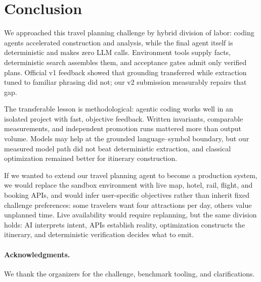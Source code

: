 \documentclass{article}
\begin{document}
\section{Conclusion}
\label{sec:conclusion}

We approached this travel planning challenge by hybrid division of labor: 
coding agents accelerated
construction and analysis, while the final agent itself is deterministic and makes
zero LLM calls. Environment tools supply facts, deterministic search assembles
them, and acceptance gates admit only verified plans. Official v1 feedback showed
that grounding transferred while extraction tuned to familiar phrasing did not;
our v2 submission measurably repairs that gap.

The transferable lesson is methodological: agentic coding works well in an
isolated project with fast, objective feedback. Written invariants, comparable
measurements, and independent promotion runs mattered more than output volume.
Models may help at the grounded language--symbol boundary, but our measured model
path did not beat deterministic extraction, and classical optimization remained
better for itinerary construction.

If we wanted to extend our travel planning agent to become a production system, we would replace the sandbox environment with live map, hotel, rail, flight,
and booking APIs, and would infer user-specific objectives rather than inherit
fixed challenge preferences: some travelers want four attractions per day, others
value unplanned time. Live availability would require replanning, but the same
division holds: AI interprets intent, APIs establish reality, optimization
constructs the itinerary, and deterministic verification decides what to emit.

\paragraph{Acknowledgments.}
We thank the organizers for the challenge, benchmark tooling, and clarifications.
{\footnotesize


}
\end{document}
